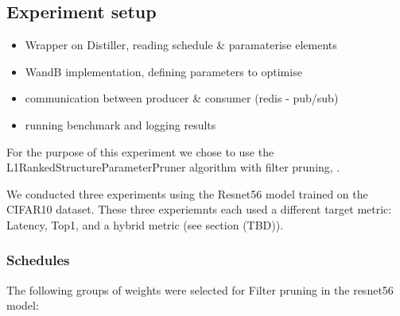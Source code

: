 \documentclass[../Dissertation.tex]{subfiles}
\begin{document}
\subsection{Experiment setup}
\begin{itemize}
    \item Wrapper on Distiller, reading schedule \& paramaterise elements
    \item WandB implementation, defining parameters to optimise
    \item communication between producer \& consumer (redis - pub/sub)
    \item running benchmark and logging results
\end{itemize}

For the purpose of this experiment we chose to use the L1RankedStructureParameterPruner algorithm with filter pruning, .

We conducted three experiments using the Resnet56 model trained on the CIFAR10 dataset. 
These three experiemnts each used a different target metric: Latency, Top1, and a hybrid metric (see section (TBD)).

\subsubsection{Schedules}
The following groups of weights were selected for Filter pruning in the resnet56 model:
\end{document}
